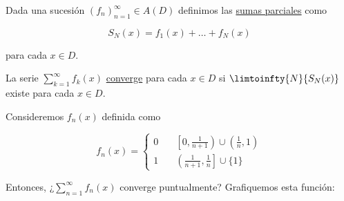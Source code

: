 \begin{defn}
    Dada una sucesión $(f_n)_{n=1}^{\infty} \in A(D)$ definimos las \ul{sumas parciales} como
    
    \[
    S_N(x) = f_1(x) + \dots + f_N(x)
    \]
    
    \noindent para cada $x \in D$.
    
    La serie $\sum_{k=1}^{\infty} f_k(x)$ \ul{converge} para cada $x \in D$ si $\limtoinfty{N}{S_N(x)}$ existe para cada $x \in D$.
\end{defn}

\begin{ejem}
    Consideremos $f_n(x)$ definida como
    
    \[
    f_n(x)=\begin{cases}
        0& \quad \left[0, \frac{1}{n+1}\right) \cup \left(\frac{1}{n}, 1\right) \\
        1& \quad \left(\frac{1}{n+1}, \frac{1}{n}\right] \cup \{1\}
    \end{cases}
    \]
    
    Entonces, ¿$\sum_{n=1}^{\infty} f_n(x)$ converge puntualmente? Grafiquemos esta función:
    
    \vspace{5mm}
    

\end{ejem}

